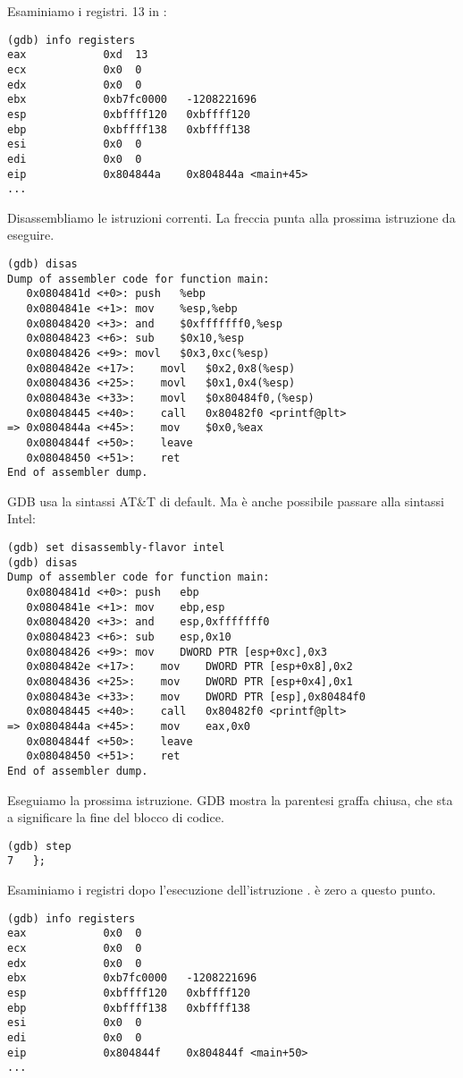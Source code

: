 Esaminiamo i registri.
13 in \EAX:

\begin{lstlisting}
(gdb) info registers
eax            0xd	13
ecx            0x0	0
edx            0x0	0
ebx            0xb7fc0000	-1208221696
esp            0xbffff120	0xbffff120
ebp            0xbffff138	0xbffff138
esi            0x0	0
edi            0x0	0
eip            0x804844a	0x804844a <main+45>
...
\end{lstlisting}

Disassembliamo le istruzioni correnti.
La freccia punta alla prossima istruzione da eseguire.

\begin{lstlisting}[style=customasmx86]
(gdb) disas
Dump of assembler code for function main:
   0x0804841d <+0>:	push   %ebp
   0x0804841e <+1>:	mov    %esp,%ebp
   0x08048420 <+3>:	and    $0xfffffff0,%esp
   0x08048423 <+6>:	sub    $0x10,%esp
   0x08048426 <+9>:	movl   $0x3,0xc(%esp)
   0x0804842e <+17>:	movl   $0x2,0x8(%esp)
   0x08048436 <+25>:	movl   $0x1,0x4(%esp)
   0x0804843e <+33>:	movl   $0x80484f0,(%esp)
   0x08048445 <+40>:	call   0x80482f0 <printf@plt>
=> 0x0804844a <+45>:	mov    $0x0,%eax
   0x0804844f <+50>:	leave
   0x08048450 <+51>:	ret
End of assembler dump.
\end{lstlisting}

\ac{GDB} usa la sintassi AT\&T di default.
Ma è anche possibile passare alla sintassi Intel:

\begin{lstlisting}[style=customasmx86]
(gdb) set disassembly-flavor intel
(gdb) disas
Dump of assembler code for function main:
   0x0804841d <+0>:	push   ebp
   0x0804841e <+1>:	mov    ebp,esp
   0x08048420 <+3>:	and    esp,0xfffffff0
   0x08048423 <+6>:	sub    esp,0x10
   0x08048426 <+9>:	mov    DWORD PTR [esp+0xc],0x3
   0x0804842e <+17>:	mov    DWORD PTR [esp+0x8],0x2
   0x08048436 <+25>:	mov    DWORD PTR [esp+0x4],0x1
   0x0804843e <+33>:	mov    DWORD PTR [esp],0x80484f0
   0x08048445 <+40>:	call   0x80482f0 <printf@plt>
=> 0x0804844a <+45>:	mov    eax,0x0
   0x0804844f <+50>:	leave
   0x08048450 <+51>:	ret
End of assembler dump.
\end{lstlisting}

Eseguiamo la prossima istruzione.
\ac{GDB} mostra la parentesi graffa chiusa, che sta a significare la fine del blocco di codice.

\begin{lstlisting}
(gdb) step
7	};
\end{lstlisting}

Esaminiamo i registri dopo l'esecuzione dell'istruzione .
\EAX è zero a questo punto.

\begin{lstlisting}
(gdb) info registers
eax            0x0	0
ecx            0x0	0
edx            0x0	0
ebx            0xb7fc0000	-1208221696
esp            0xbffff120	0xbffff120
ebp            0xbffff138	0xbffff138
esi            0x0	0
edi            0x0	0
eip            0x804844f	0x804844f <main+50>
...
\end{lstlisting}
